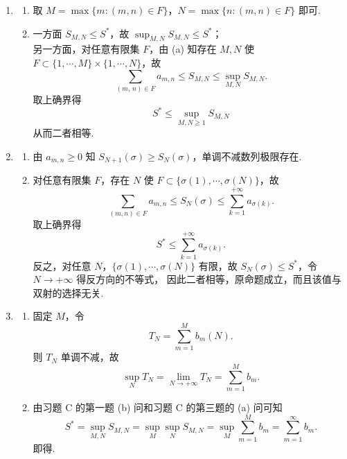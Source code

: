 \begin{solution}
    \begin{enumerate}[leftmargin=*,label=\arabic*.]%
    \item
    \begin{enumerate}[leftmargin=*,label=(\alph*)]
    \item[(a)] 取 $M = \max\{m : (m,n) \in F\}$，$N = \max\{n : (m,n) \in F\}$ 即可.

    \item[(b)]
    一方面 $S_{M,N} \le S^*$，故 $\displaystyle \sup_{M,N} S_{M,N} \le S^*$；\\
    另一方面，对任意有限集 $F$，由 (a) 知存在 $M,N$ 使 $F \subset \{1,\cdots,M\}\times\{1,\cdots,N\}$，故 
    \[
    \sum_{(m,\,n)\in F} a_{m,n} \le S_{M,N} \le \sup_{M,N} S_{M,N}.
    \]
    取上确界得 
    \[
    S^* \le \sup_{M,N\geq 1} S_{M,N}
    \]
    从而二者相等. 
    \end{enumerate}

    \item 
    \begin{enumerate}
    \item[(a)] 由 $a_{m,n} \ge 0$ 知 $S_{N+1}(\sigma) \ge S_N(\sigma)$，单调不减数列极限存在. 

    \item[(b)]
    对任意有限集 $F$，存在 $N$ 使 $F \subset \{\sigma(1),\cdots,\sigma(N)\}$，故 
    \[
    \sum_{(m,n)\in F} a_{m,n} \le S_N(\sigma) \le \sum_{k=1}^{+\infty} a_{\sigma(k)}.
    \]
    取上确界得 
    \[
    S^* \le \sum_{k=1}^{+\infty} a_{\sigma(k)}.
    \]
    反之，对任意 $N$，$\{\sigma(1),\cdots,\sigma(N)\}$ 有限，故 $S_N(\sigma) \le S^*$，令 $N\to+\infty$ 得反方向的不等式，
    因此二者相等，原命题成立，而且该值与双射的选择无关. 
    \end{enumerate}

    \item 
    \begin{enumerate}[leftmargin=*,label=(\alph*)]
    \item[(a)] 固定 $M$，令 
    \[
    T_N = \sum_{m=1}^M b_m(N).
    \]
    则 $T_N$ 单调不减，故 
    \[
    \sup_N T_N = \lim_{N\to+\infty} T_N = \sum_{m=1}^M b_m. 
    \]

    \item[(b)] 由习题 C 的第一题 (b) 问和习题 C 的第三题的 (a) 问可知
    \[
    S^* = \sup_{M,N} S_{M,N} = \sup_{M} \sup_{N} S_{M,N} = \sup_{M} \sum_{m=1}^{M} b_m = \sum_{m=1}^{\infty} b_m.
    \]
    即得. 
    \end{enumerate}


\end{enumerate}
\end{solution}
